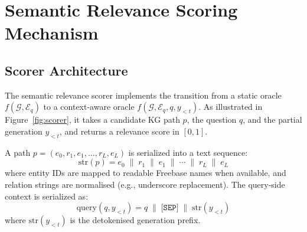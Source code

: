 \section{Semantic Relevance Scoring Mechanism}
\label{sec:ch3scorer}

\subsection{Scorer Architecture}

The semantic relevance scorer implements the transition from a static oracle $f(\mathcal{G}, \mathcal{E}_q)$ to a context-aware oracle $f(\mathcal{G}, \mathcal{E}_q, q, y_{<t})$. As illustrated in Figure~\ref{fig:scorer}, it takes a candidate KG path $p$, the question $q$, and the partial generation $y_{<t}$, and returns a relevance score in $[0,1]$.

A path $p = (e_0, r_1, e_1, \ldots, r_L, e_L)$ is serialized into a text sequence:
\begin{equation}
  \text{str}(p) = e_0 \;\|\; r_1 \;\|\; e_1 \;\|\; \cdots \;\|\; r_L \;\|\; e_L
  \label{eq:pathstr}
\end{equation}
where entity IDs are mapped to readable Freebase names when available, and relation strings are normalised (e.g., underscore replacement). The query-side context is serialized as:
\begin{equation}
  \text{query}(q, y_{<t}) = q \;\|\; \texttt{[SEP]} \;\|\;
  \text{str}(y_{<t})
  \label{eq:querystr}
\end{equation}
where $\text{str}(y_{<t})$ is the detokenised generation prefix.

